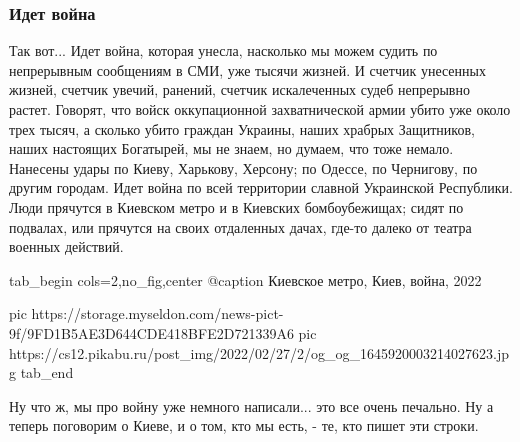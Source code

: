  
 
 
 
 

\subsubsection{Идет война}
\label{sec:moje.prizyv.idet_vojna}

Так вот... Идет война, которая унесла, насколько мы можем судить по непрерывным
сообщениям в СМИ, уже тысячи жизней. И счетчик унесенных жизней, счетчик
увечий, ранений, счетчик искалеченных судеб непрерывно растет. Говорят, что
войск оккупационной захватнической армии убито уже около трех тысяч, а сколько
убито граждан Украины, наших храбрых Защитников, наших настоящих Богатырей, мы
не знаем, но думаем, что тоже немало. Нанесены удары по Киеву, Харькову,
Херсону; по Одессе, по Чернигову, по другим городам. Идет война по всей
территории славной Украинской Республики. Люди прячутся в Киевском метро и в Киевских 
бомбоубежищах; сидят по подвалах, или прячутся на своих отдаленных дачах, где-то далеко от театра
военных действий. 

\ifcmt
  tab_begin cols=2,no_fig,center
		 @caption Киевское метро, Киев, война, 2022

		 pic https://storage.myseldon.com/news-pict-9f/9FD1B5AE3D644CDE418BFE2D721339A6
     pic https://cs12.pikabu.ru/post_img/2022/02/27/2/og_og_1645920003214027623.jpg
  tab_end
\fi

Ну что ж, мы про войну уже немного написали... это все очень печально. Ну а
теперь поговорим о Киеве, и о том, кто мы есть, - те, кто пишет эти строки.
